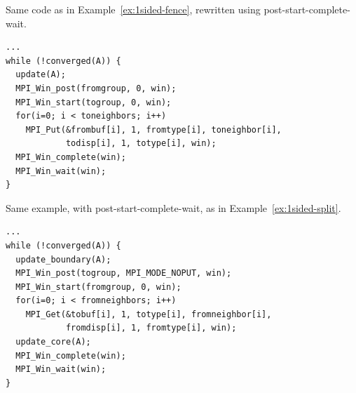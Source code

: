 \begin{example}
%
Same code as in Example~\ref{ex:1sided-fence},
rewritten using post-start-complete-wait.
\begin{lstlisting}[language={[MPI]C}]
...
while (!converged(A)) {
  update(A);
  MPI_Win_post(fromgroup, 0, win);
  MPI_Win_start(togroup, 0, win);
  for(i=0; i < toneighbors; i++)
    MPI_Put(&frombuf[i], 1, fromtype[i], toneighbor[i],
            todisp[i], 1, totype[i], win);
  MPI_Win_complete(win);
  MPI_Win_wait(win);
}
\end{lstlisting}
\end{example}

\begin{example}
%
Same example, with post-start-complete-wait, as in Example~\ref{ex:1sided-split}.
\begin{lstlisting}[language={[MPI]C}]
...
while (!converged(A)) {
  update_boundary(A);
  MPI_Win_post(togroup, MPI_MODE_NOPUT, win);
  MPI_Win_start(fromgroup, 0, win);
  for(i=0; i < fromneighbors; i++)
    MPI_Get(&tobuf[i], 1, totype[i], fromneighbor[i],
            fromdisp[i], 1, fromtype[i], win);
  update_core(A);
  MPI_Win_complete(win);
  MPI_Win_wait(win);
}
\end{lstlisting}
\end{example}

